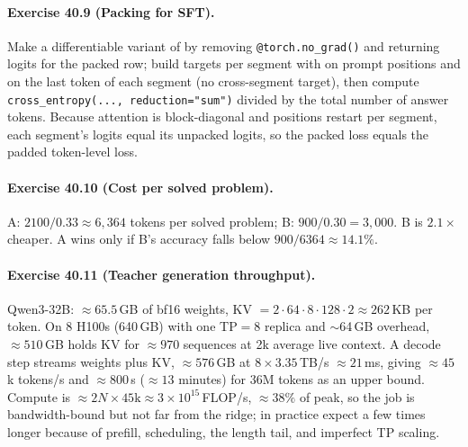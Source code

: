 \paragraph{Exercise 40.9 (Packing for SFT).}
Make a differentiable variant of  by removing \texttt{@torch.no\_grad()} and
returning logits for the packed row; build targets per segment with  on prompt
positions and on the last token of each segment (no cross-segment target), then compute
\texttt{cross\_entropy(..., reduction="sum")} divided by the total number of answer tokens. Because
attention is block-diagonal and positions restart per segment, each segment's logits equal its
unpacked logits, so the packed loss equals the padded token-level loss.

\paragraph{Exercise 40.10 (Cost per solved problem).}
A: $2100/0.33\approx6{,}364$ tokens per solved problem; B: $900/0.30=3{,}000$. B is $2.1\times$
cheaper. A wins only if B's accuracy falls below $900/6364\approx14.1\%$.

\paragraph{Exercise 40.11 (Teacher generation throughput).}
Qwen3-32B: $\approx65.5$\,GB of bf16 weights, KV $=2\cdot64\cdot8\cdot128\cdot2\approx262$\,KB per
token. On 8 H100s (640\,GB) with one TP$=8$ replica and $\sim$64\,GB overhead, $\approx510$\,GB holds KV
for $\approx970$ sequences at 2k average live context. A decode step streams weights plus KV,
$\approx576$\,GB at $8\times3.35$\,TB/s $\approx21$\,ms, giving $\approx45$k tokens/s and
$\approx 800$\,s ($\approx13$ minutes) for 36M tokens as an upper bound. Compute is $\approx2N\times45\text{k}
\approx3\times10^{15}$\,FLOP/s, $\approx38\%$ of peak, so the job is bandwidth-bound but not far from
the ridge; in practice expect a few times longer because of prefill, scheduling, the length tail,
and imperfect TP scaling.
